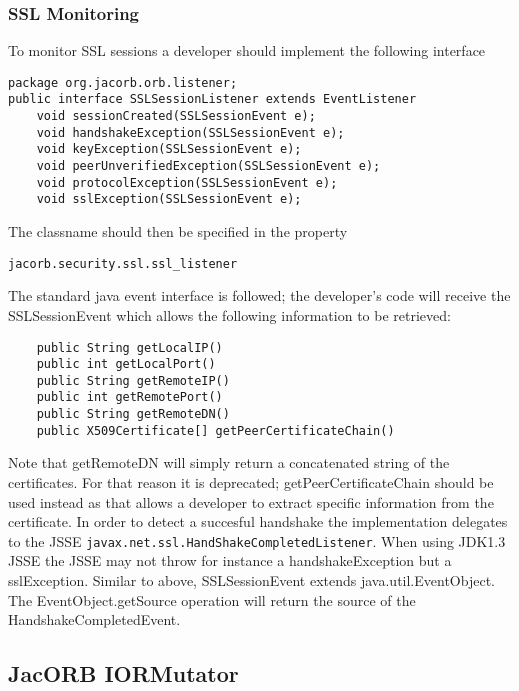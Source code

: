{{\subsubsection{SSL Monitoring}

To monitor SSL sessions a developer should implement the following interface
\begin{small}
\begin{verbatim}
package org.jacorb.orb.listener;
public interface SSLSessionListener extends EventListener
    void sessionCreated(SSLSessionEvent e);
    void handshakeException(SSLSessionEvent e);
    void keyException(SSLSessionEvent e);
    void peerUnverifiedException(SSLSessionEvent e);
    void protocolException(SSLSessionEvent e);
    void sslException(SSLSessionEvent e);
\end{verbatim}
\end{small}
The classname should then be specified in the property
\begin{verbatim}
jacorb.security.ssl.ssl_listener
\end{verbatim}

The standard java event interface is followed; the developer's code will receive the
SSLSessionEvent which allows the following information to be retrieved:
\begin{small}
\begin{verbatim}
    public String getLocalIP()
    public int getLocalPort()
    public String getRemoteIP()
    public int getRemotePort()
    public String getRemoteDN()
    public X509Certificate[] getPeerCertificateChain()
\end{verbatim}
\end{small}

Note that getRemoteDN will simply return a concatenated string of the
certificates. For that reason it is deprecated; getPeerCertificateChain should
be used instead as that allows a developer to extract specific information from
the certificate.  In order to detect a succesful handshake the implementation
delegates to the JSSE {\tt javax.net.ssl.HandShakeCompletedListener}. When using
JDK1.3 JSSE the JSSE may not throw for instance a handshakeException but a
sslException. Similar to above, SSLSessionEvent extends java.util.EventObject. The
EventObject.getSource operation will return the source of the HandshakeCompletedEvent.

\subsection{JacORB IORMutator}
\label{eventLogging}

}}
